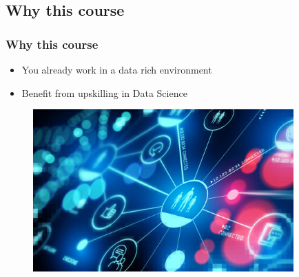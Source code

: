 \subsection{Why this course}
\begin{frame}\frametitle{Why this course}
   \begin{itemize}
      \item You already work in a data rich environment
      \item Benefit from upskilling in Data Science 
   \end{itemize}


   \begin{figure}[H]
      \includegraphics[width=10cm]{../images/illustrations/data_everywhere.jpeg}
   \end{figure}
\end{frame} 


